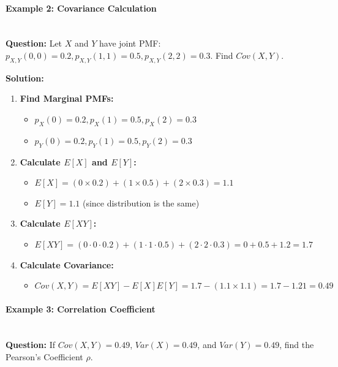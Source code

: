 \documentclass[11pt]{article}
\begin{document}
\paragraph{Example 2: Covariance Calculation} \leavevmode \\
\textbf{Question:} Let $X$ and $Y$ have joint PMF: $p_{X,Y}(0,0)=0.2, p_{X,Y}(1,1)=0.5, p_{X,Y}(2,2)=0.3$. Find $Cov(X,Y)$.

\vspace{0.5cm}
\textbf{Solution:}
\begin{enumerate}
    \item \textbf{Find Marginal PMFs:}
    \begin{itemize}
        \item $p_X(0)=0.2, p_X(1)=0.5, p_X(2)=0.3$
        \item $p_Y(0)=0.2, p_Y(1)=0.5, p_Y(2)=0.3$
    \end{itemize}
    \item \textbf{Calculate $E[X]$ and $E[Y]$:}
    \begin{itemize}
        \item $E[X] = (0 \times 0.2) + (1 \times 0.5) + (2 \times 0.3) = 1.1$
        \item $E[Y] = 1.1$ (since distribution is the same)
    \end{itemize}
    \item \textbf{Calculate $E[XY]$:}
    \begin{itemize}
        \item $E[XY] = (0 \cdot 0 \cdot 0.2) + (1 \cdot 1 \cdot 0.5) + (2 \cdot 2 \cdot 0.3) = 0 + 0.5 + 1.2 = 1.7$
    \end{itemize}
    \item \textbf{Calculate Covariance:}
    \begin{itemize}
        \item $Cov(X,Y) = E[XY] - E[X]E[Y] = 1.7 - (1.1 \times 1.1) = 1.7 - 1.21 = 0.49$
    \end{itemize}
\end{enumerate}


\vspace{0.1 cm}

\paragraph{Example 3: Correlation Coefficient} \leavevmode \\
\textbf{Question:} If $Cov(X,Y) = 0.49$, $Var(X) = 0.49$, and $Var(Y) = 0.49$, find the Pearson's Coefficient $\rho$.
\end{document}
